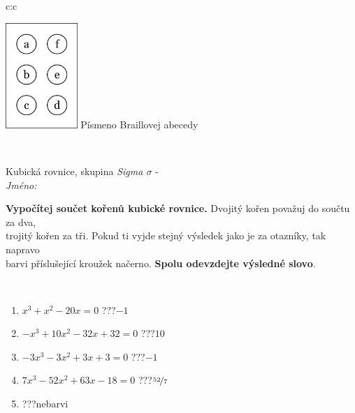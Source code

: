 \documentclass[10pt]{report}
\begin{document}
\begin{tabular}{c:c}
\begin{minipage}[c][104.5mm][t]{0.5\linewidth}
\begin{center}
\begin{minipage}{0.20\linewidth}
\begin{center}
\includegraphics[height=40mm]{../images/braille.png}
{\small Písmeno Braillovej abecedy}
\end{center}
\end{minipage}
\end{center}
\end{minipage}
\\ \hdashline
\begin{minipage}[c][104.5mm][t]{0.5\linewidth}
\begin{center}
\vspace{7mm}
{\huge Kubická rovnice, skupina \textit{Sigma $\sigma$} -}\\[5mm]
\textit{Jméno:}\phantom{xxxxxxxxxxxxxxxxxxxxxxxxxxxxxxxxxxxxxxxxxxxxxxxxxxxxxxxxxxxxxxxxx}\\[5mm]
\begin{minipage}{0.95\linewidth}
\begin{center}
\textbf{Vypočítej součet kořenů kubické rovnice.} Dvojitý kořen považuj do součtu za dva,\\trojitý kořen za tři. Pokud ti vyjde stejný výsledek jako je za otazníky, tak napravo\\barvi příslušející kroužek načerno. \textbf{Spolu odevzdejte výsledné slovo}.
\end{center}
\end{minipage}
\\[1mm]
\begin{minipage}{0.79\linewidth}
\begin{center}
\begin{varwidth}{\linewidth}
\begin{enumerate}
\Large
\item $x^3+x^2-20x=0$\quad \dotfill\; ???\;\dotfill \quad $-1$
\item $-x^3+10x^2-32x+32=0$\quad \dotfill\; ???\;\dotfill \quad $10$
\item $-3x^3-3x^2+3x+3=0$\quad \dotfill\; ???\;\dotfill \quad $-1$
\item $7x^3-52x^2+63x-18=0$\quad \dotfill\; ???\;\dotfill \quad $\nicefrac{52}{7}$
\item \quad \dotfill\; ???\;\dotfill \quad nebarvi

\end{enumerate}
\end{varwidth}
\end{center}
\end{minipage}
\end{center}
\end{minipage}
\end{tabular}
\end{document}
